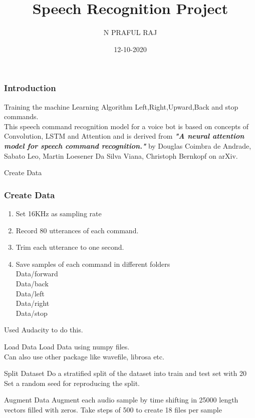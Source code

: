 \documentclass[11pt]{beamer}
\author{N PRAFUL RAJ}
\title{Speech Recognition Project}
\institute[IIT-H]
{
\\Guided by:\\Dr G.V.V.Sharma
}
\date{12-10-2020}
\begin{document}
\begin{frame}
\titlepage
\end{frame}



\begin{frame}
\frametitle{Introduction}
Training the machine Learning Algorithm Left,Right,Upward,Back and stop commands.\\
This speech command recognition model for a voice bot is based on concepts of Convolution, LSTM and Attention and is derived from \textbf{\textit{"A neural attention model for speech command
recognition."}} by Douglas Coimbra de Andrade, Sabato Leo, Martin Loesener Da Silva Viana, Christoph Bernkopf on arXiv.




\end{frame}

\begin{frame}{Create Data}
\frametitle{Create Data}
\begin{enumerate}
 \item Set 16KHz as sampling rate
    \item Record 80 utterances of each command.
    \item Trim each utterance to one second.
    \item Save samples of each command in different folders\\
        Data/forward\\
        Data/back\\
        Data/left\\
        Data/right\\
        Data/stop
\end{enumerate}

Used Audacity to do this.
\end{frame}

\begin{frame}
{Load Data}
Load Data using numpy files.\\
Can also use other package like wavefile,
librosa etc.
\end{frame}


\begin{frame}
{Split Dataset}
Do a stratified split of the dataset into train and test
set with 20%
Set a random seed for reproducing the split.
\end{frame}


\begin{frame}
{Augment Data}
Augment each audio sample by time shifting in 25000
length vectors filled with zeros.
Take steps of 500 to create 18 files per sample
\end{frame}
\end{document}
